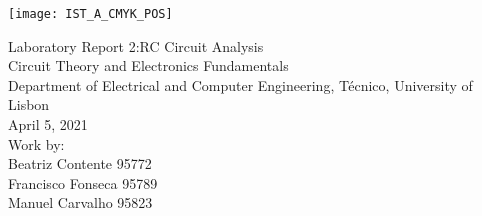 
\thispagestyle {empty}

\texttt{[image: IST\_A\_CMYK\_POS]}

\begin{center}
%
\vspace{1.0cm}

\vspace{1cm}
{\FontLb Laboratory Report 2:RC Circuit Analysis} \\ %
\vspace{1cm}
{\FontSn Circuit Theory and Electronics Fundamentals} \\
\vspace{1cm}
{\FontSn Department of Electrical and Computer Engineering, Técnico, University of Lisbon} \\ %
\vspace{1cm}
{\FontSn April 5, 2021} \\ %
\vspace{1cm}
{\FontSn Work by:} \\ 
\vspace{0.5cm}
{\FontSn Beatriz Contente 95772} \\ 
\vspace{0.5cm}
{\FontSn Francisco Fonseca 95789} \\ 
\vspace{0.5cm}
{\FontSn Manuel Carvalho 95823} \\ 
%
\end{center}
